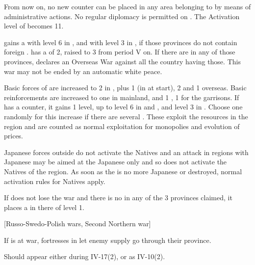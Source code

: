 \effetlong
\aparag From now on, no new \TP counter can be placed in any area belonging to
\paysJapon by means of administrative actions.
\aparag No regular diplomacy is permitted on \paysJapon.  The Activation level
of \paysJapon becomes 11.



\phevnt
\aparag \paysJapon gains a \TP with level 6 in \provinceSeoul,
\provincePyongyang and with level 3 in \granderegionFormose, if those
provinces do not contain foreign \TP. \paysJapon has a \FTI of 2, raised to 3
from period V on.
\aparag If there are \TP in any of those provinces, \paysJapon declares an
Overseas War against all the country having those. This war may not be ended
by an automatic white peace.

\phadm
\aparag Basic forces of \paysJapon are increased to 2 \ARMY\faceplus in
\paysJapon, plus 1 \ARMY\faceplus (in \granderegionCorea at start), 2 \LD and
1 \FLEET\facemoins overseas.
\aparag Basic reinforcements are increased to one \ARMY\faceplus in mainland,
and 1 \ARMY\facemoins, 1 \ND for the garrisons.
\aparag If \paysJapon has a \TP counter, it gains 1 level, up to level 6 in
\provinceSeoul and \provincePyongyang, and level 3 in
\granderegionFormose. Choose one randomly for this increase if there are
several \TP.  These \TP exploit the resources in the region and are counted as
normal exploitation for monopolies and evolution of prices.

\phmil
\aparag Japanese forces outside \granderegionJapan do not activate the Natives
and an attack in regions with Japanese \TP may be aimed at the Japanese only
and so does not activate the Natives of the region. As soon as the \TP is no
more Japanese or destroyed, normal activation rules for Natives apply.

\phpaix
\aparag If \paysJapon does not lose the war and there is no \TP in any of the
3 provinces claimed, it places a \TP in there of level 1.


[Russo-Swedo-Polish wars, Second Northern war]

If \POL is at war, fortresses in \paysLithuanie let enemy supply go through
their province.

Should appear either during IV-17(2), or as IV-10(2).


